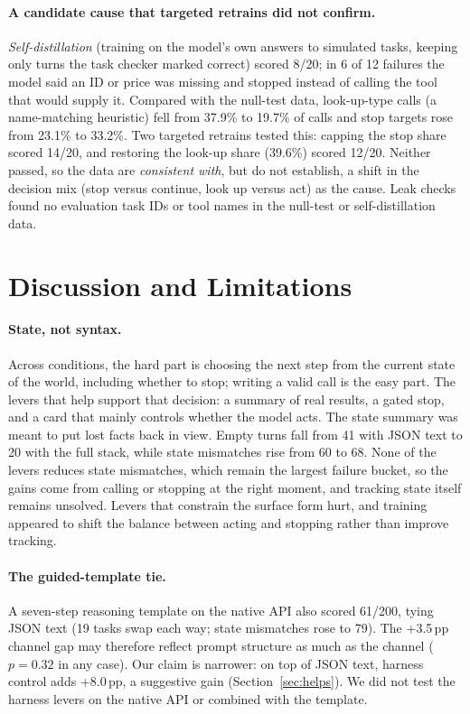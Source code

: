 \documentclass[11pt]{article}
\newcommand{\pp}{\,pp\xspace}
\begin{document}
\paragraph{A candidate cause that targeted retrains did not confirm.} \emph{Self-distillation} (training on the model's own answers to simulated tasks, keeping only turns the task checker marked correct) scored 8/20; in 6 of 12 failures the model said an ID or price was missing and stopped instead of calling the tool that would supply it. Compared with the null-test data, look-up-type calls (a name-matching heuristic) fell from 37.9\% to 19.7\% of calls and stop targets rose from 23.1\% to 33.2\%. Two targeted retrains tested this: capping the stop share scored 14/20, and restoring the look-up share (39.6\%) scored 12/20. Neither passed, so the data are \emph{consistent with}, but do not establish, a shift in the decision mix (stop versus continue, look up versus act) as the cause. Leak checks found no evaluation task IDs or tool names in the null-test or self-distillation data.

\section{Discussion and Limitations}
\label{sec:discussion}

\paragraph{State, not syntax.} Across conditions, the hard part is choosing the next step from the current state of the world, including whether to stop; writing a valid call is the easy part. The levers that help support that decision: a summary of real results, a gated stop, and a card that mainly controls whether the model acts. The state summary was meant to put lost facts back in view. Empty turns fall from 41 with JSON text to 20 with the full stack, while state mismatches rise from 60 to 68. None of the levers reduces state mismatches, which remain the largest failure bucket, so the gains come from calling or stopping at the right moment, and tracking state itself remains unsolved. Levers that constrain the surface form hurt, and training appeared to shift the balance between acting and stopping rather than improve tracking.

\paragraph{The guided-template tie.} A seven-step reasoning template on the native API also scored 61/200, tying JSON text (19 tasks swap each way; state mismatches rose to 79). The +3.5\pp channel gap may therefore reflect prompt structure as much as the channel ($p=0.32$ in any case). Our claim is narrower: on top of JSON text, harness control adds +8.0\pp, a suggestive gain (Section~\ref{sec:helps}). We did not test the harness levers on the native API or combined with the template.
\end{document}
